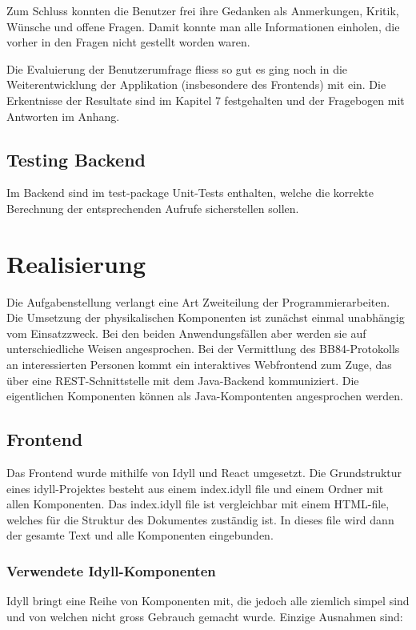 \documentclass[a4paper,10.2pt,pdftex]{scrartcl}%
\begin{document}
Zum Schluss konnten die Benutzer frei ihre Gedanken als Anmerkungen, Kritik, Wünsche und offene Fragen. Damit konnte man alle Informationen einholen, die vorher in den Fragen nicht gestellt worden waren.

Die Evaluierung der Benutzerumfrage fliess so gut es ging noch in die Weiterentwicklung der Applikation (insbesondere des Frontends) mit ein. Die Erkentnisse der Resultate sind im Kapitel 7 festgehalten und der Fragebogen mit Antworten im Anhang.

\subsection{Testing Backend}
Im Backend sind im test-package Unit-Tests enthalten, welche die korrekte Berechnung der entsprechenden Aufrufe sicherstellen sollen. 


\section{Realisierung}
Die Aufgabenstellung verlangt eine Art Zweiteilung der Programmierarbeiten. Die Umsetzung der physikalischen Komponenten ist zunächst einmal unabhängig vom Einsatzzweck. Bei den beiden Anwendungsfällen aber werden sie auf unterschiedliche Weisen angesprochen. Bei der Vermittlung des BB84-Protokolls an interessierten Personen kommt ein interaktives Webfrontend zum Zuge, das über eine REST-Schnittstelle mit dem Java-Backend kommuniziert. Die eigentlichen Komponenten können als Java-Kompontenten angesprochen werden. 


\subsection{Frontend}
Das Frontend wurde mithilfe von Idyll und React umgesetzt. Die Grundstruktur eines idyll-Projektes besteht aus einem index.idyll file und einem Ordner mit allen Komponenten. Das index.idyll file ist vergleichbar mit einem HTML-file, welches für die Struktur des Dokumentes zuständig ist. In dieses file wird dann der gesamte Text und alle Komponenten eingebunden.
\subsubsection{Verwendete Idyll-Komponenten}
Idyll bringt eine Reihe von Komponenten mit, die jedoch alle ziemlich simpel sind und von welchen nicht gross Gebrauch gemacht wurde. Einzige Ausnahmen sind:
\end{document}
